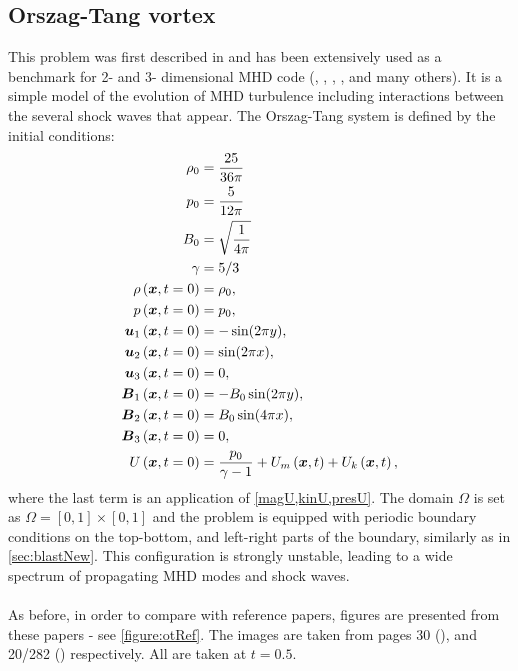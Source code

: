 \subsection{Orszag-Tang vortex}
This problem was first described in \cite{vortex} and has been extensively used as a benchmark for 2- and 3- dimensional MHD code (\cite{blast0}, \cite{blast1}, \cite{honzaFem}, \cite{otnew}, and many others). It is a simple model of the evolution of MHD turbulence including interactions between the several shock waves that appear. The Orszag-Tang system is defined by the initial conditions:
\begin{align}
\rho_0 & =  \frac{25}{36 \pi}\\ \nonumber
p_0 & =  \frac{5}{12 \pi}\\  \nonumber
B_0 & =  \sqrt{\frac{1}{4 \pi}}\\ \nonumber
\gamma & =  5 / 3\\ \nonumber
\rho\left(\mbox{\boldmath $x$}, t = 0\right) & =  \rho_0,\\ \nonumber
p\left(\mbox{\boldmath $x$}, t = 0\right) & =  p_0,\\ \nonumber
\mbox{\boldmath $u$}_1\left(\mbox{\boldmath $x$}, t = 0\right) & =  -\sin(2 \pi y),\\ \nonumber
\mbox{\boldmath $u$}_2\left(\mbox{\boldmath $x$}, t = 0\right) & =  \sin(2 \pi x),\\ \nonumber
\mbox{\boldmath $u$}_3\left(\mbox{\boldmath $x$}, t = 0\right) & =  0,\\ \nonumber
\mbox{\boldmath $B$}_1\left(\mbox{\boldmath $x$}, t = 0\right) & =  -B_0 \sin(2 \pi y),\\ \nonumber
\mbox{\boldmath $B$}_2\left(\mbox{\boldmath $x$}, t = 0\right) & =  B_0 \sin(4 \pi x),\\ \nonumber
\mbox{\boldmath $B$}_3\left(\mbox{\boldmath $x$}, t = 0\right) & =  0,\\ \nonumber
U\left(\mbox{\boldmath $x$}, t = 0\right) & =  \frac{p_0}{\gamma - 1} + U_m\left(\mbox{\boldmath $x$}, t\right) + U_k\left(\mbox{\boldmath $x$}, t\right),
\end{align}
where the last term is an application of \cref{magU,kinU,presU}. The domain $\Omega$ is set as $\Omega = [0, 1] \times [0, 1]$ and the problem is equipped with periodic boundary conditions on the top-bottom, and left-right parts of the boundary, similarly as in \cref{sec:blastNew}. This configuration is strongly unstable, leading to a wide spectrum of propagating MHD modes and shock waves.
\paragraph{}
As before, in order to compare with reference papers, figures are presented from these papers - see \cref{figure:otRef}. The images are taken from pages 30 (\cite{blast1}), and 20/282 (\cite{blast0}) respectively. All are taken at $t = 0.5$.

